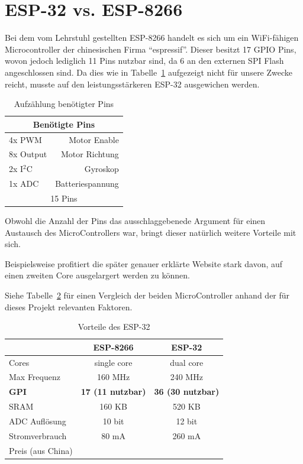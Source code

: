 \section{ESP-32 vs. ESP-8266}
Bei dem vom Lehrstuhl gestellten ESP-8266 handelt es sich um ein WiFi-fähigen Microcontroller der chinesischen Firma ``espressif''.
Dieser besitzt 17 GPIO Pins, wovon jedoch lediglich 11 Pins nutzbar sind, da 6 an den externen SPI Flash angeschlossen sind.
Da dies wie in Tabelle~\ref{table:pins} aufgezeigt nicht für unsere Zwecke reicht, musste auf den leistungsstärkeren ESP-32 ausgewichen werden.

\begin{table}[!ht]
\centering
\begin{tabular}{lr}
	\multicolumn{2}{c}{Benötigte Pins} \\ 
	\midrule[3pt] 
	4x PWM & Motor Enable \\ 
	\midrule 
	8x Output & Motor Richtung \\ 
	\midrule 
	2x I$^2$C & Gyroskop \\ 
	\midrule 
	1x ADC & Batteriespannung \\ 
	\midrule
	\midrule 
	\multicolumn{2}{c}{15 Pins} \\ 
	 
\end{tabular} 
\caption{Aufzählung benötigter Pins} 
\label{table:pins}
\end{table} 

Obwohl die Anzahl der Pins das ausschlaggebenede Argument für einen Austausch des MicroControllers war, bringt dieser natürlich weitere Vorteile mit sich.

Beispielsweise profitiert die später genauer erklärte Website stark davon, auf einen zweiten Core ausgelargert werden zu können.

Siehe Tabelle~\ref{table:esp32} für einen Vergleich der beiden MicroController anhand der für dieses Projekt relevanten Faktoren.


\begin{table}[!ht]
\centering	
\begin{tabular}{lcc}
	& ESP-8266 & ESP-32 \\ 
	\midrule[3pt]
	Cores & single core & dual core \\ 
	\midrule
	Max Frequenz & 160 MHz & 240 MHz \\ 
	\midrule 
	\textbf{GPI} & \textbf{17 (11 nutzbar)} & \textbf{36 (30 nutzbar)} \\ 
	\midrule
	SRAM & 160 KB & 520 KB \\ 
	\midrule
	ADC Auflösung & 10 bit & 12 bit \\ 
	\midrule
	Stromverbrauch & 80 mA & 260 mA \\ 
	\midrule
	Preis (aus China) & \EUR{2} & \EUR{4} \\ 
\end{tabular} 
\caption{Vorteile des ESP-32} 
\label{table:esp32}
\end{table} 


